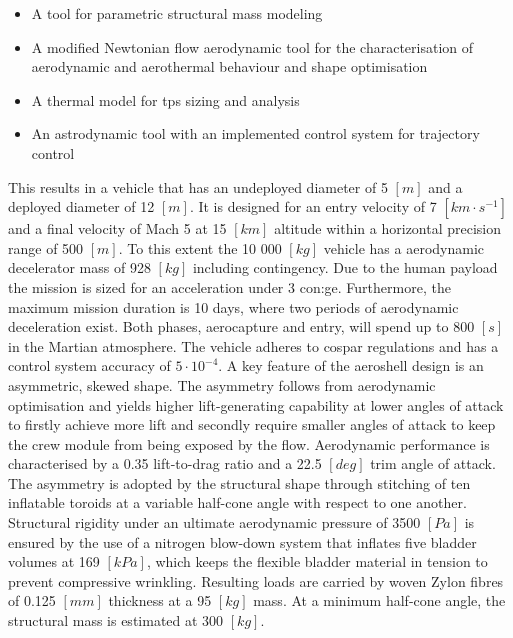 \begin{itemize}
\item A tool for parametric structural mass modeling
\item A modified Newtonian flow aerodynamic tool for the characterisation of aerodynamic and aerothermal behaviour and shape optimisation
\item A thermal model for \acrfull{tps} sizing and analysis
\item An astrodynamic tool with an implemented control system for trajectory control
\end{itemize}
\vspace{1mm}
This results in a vehicle that has an undeployed diameter of 5 $ \left[ m \right] $ and a deployed diameter of 12 $ \left[ m \right] $. It is designed for an entry velocity of 7 $ \left[ km \cdot s^{-1} \right] $ and a final velocity of Mach 5 at  15 $ \left[ km \right] $ altitude within a horizontal precision range of 500 $ \left[ m \right] $. To this extent the 10 000 $ \left[ kg \right] $ vehicle has a aerodynamic decelerator mass of 928 $ \left[ kg \right] $ including contingency. Due to the human payload the mission is sized for an acceleration under 3 \gls{con:ge}. Furthermore, the maximum mission duration is 10 days, where two periods of aerodynamic deceleration exist. Both phases, aerocapture and entry, will spend up to 800 $ \left[ s \right] $ in the Martian atmosphere. The vehicle adheres to \acrshort{cospar} regulations and has a control system accuracy of $ 5 \cdot 10^{-4} $.
\newline
\newline
A key feature of the aeroshell design is an asymmetric, skewed shape. The asymmetry follows from aerodynamic optimisation and yields higher lift-generating capability at lower angles of attack to firstly achieve more lift and secondly require smaller angles of attack to keep the crew module from being exposed by the flow. Aerodynamic performance is characterised by a 0.35 lift-to-drag ratio and a 22.5 $\left[deg\right]$ trim angle of attack.
\newline
\newline
The asymmetry is adopted by the structural shape through stitching of ten inflatable toroids at a variable half-cone angle with respect to one another. Structural rigidity under an ultimate aerodynamic pressure of 3500 $\left[Pa\right]$ is ensured by the use of a nitrogen blow-down system that inflates five bladder volumes at 169 $\left[kPa\right]$, which keeps the flexible bladder material in tension to prevent compressive wrinkling. Resulting loads are carried by woven Zylon fibres of 0.125 $\left[mm\right]$ thickness at a 95 $\left[kg\right]$ mass. At a minimum half-cone angle, the structural mass is estimated at 300 $\left[kg\right]$. 
